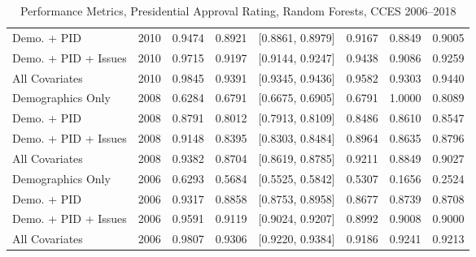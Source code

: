 \begin{table}[ht]
\begin{tabular}{lrrrlrrr}
  Demo. + PID & 2010 & 0.9474 & 0.8921 & [0.8861, 0.8979] & 0.9167 & 0.8849 & 0.9005 \\ 
  Demo. + PID + Issues & 2010 & 0.9715 & 0.9197 & [0.9144, 0.9247] & 0.9438 & 0.9086 & 0.9259 \\ 
  All Covariates & 2010 & 0.9845 & 0.9391 & [0.9345, 0.9436] & 0.9582 & 0.9303 & 0.9440 \\ 
  Demographics Only & 2008 & 0.6284 & 0.6791 & [0.6675, 0.6905] & 0.6791 & 1.0000 & 0.8089 \\ 
  Demo. + PID & 2008 & 0.8791 & 0.8012 & [0.7913, 0.8109] & 0.8486 & 0.8610 & 0.8547 \\ 
  Demo. + PID + Issues & 2008 & 0.9148 & 0.8395 & [0.8303, 0.8484] & 0.8964 & 0.8635 & 0.8796 \\ 
  All Covariates & 2008 & 0.9382 & 0.8704 & [0.8619, 0.8785] & 0.9211 & 0.8849 & 0.9027 \\ 
  Demographics Only & 2006 & 0.6293 & 0.5684 & [0.5525, 0.5842] & 0.5307 & 0.1656 & 0.2524 \\ 
  Demo. + PID & 2006 & 0.9317 & 0.8858 & [0.8753, 0.8958] & 0.8677 & 0.8739 & 0.8708 \\ 
  Demo. + PID + Issues & 2006 & 0.9591 & 0.9119 & [0.9024, 0.9207] & 0.8992 & 0.9008 & 0.9000 \\ 
  All Covariates & 2006 & 0.9807 & 0.9306 & [0.9220, 0.9384] & 0.9186 & 0.9241 & 0.9213 \\ 
   \bottomrule
\end{tabular}
\caption{Performance Metrics, Presidential Approval Rating, Random Forests, CCES 2006--2018} 
\label{tab:cces_presapprov_rf}
\end{table}
